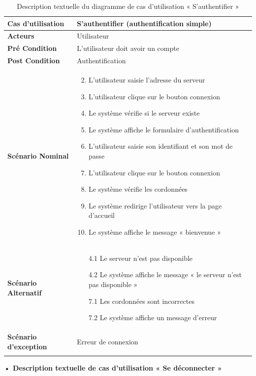 \begin{longtable}{|p{5cm}|p{10cm}|}
\hline
\textbf{Cas d'utilisation}&S'authentifier (authentification simple)\\
\hline
\textbf{Acteurs}&Utilisateur\\
\hline
\textbf{Pré Condition}&L'utilisateur doit avoir un compte\\
\hline
\textbf{Post Condition}&Authentification\\
\hline
\textbf{Scénario Nominal}&
\vspace{-\baselineskip}
\begin{enumerate}
    \setcounter{enumi}{1}
  \item L'utilisateur saisie l'adresse du serveur
  \item L'utilisateur clique sur le bouton connexion
  \item Le système vérifie si le serveur existe
  \item Le système affiche le formulaire d'authentification
  \item L'utilisateur saisie son identifiant et son mot de passe
  \item L'utilisateur clique sur le bouton connexion
  \item Le système vérifie les cordonnées
  \item Le système redirige l'utilisateur vers la page d'accueil
  \item Le système affiche le message « bienvenue »
\end{enumerate}\\
\hline
\textbf{Scénario Alternatif}&
\vspace{-\baselineskip}
\begin{enumerate}
      \item [4.1] Le serveur n'est pas disponible
      \item [4.2] Le système affiche le message « le serveur n'est pas disponible »
      \item [7.1] Les cordonnées sont incorrectes
      \item [7.2] Le système affiche un message d'erreur
\end{enumerate}\\
\hline
\textbf{Scénario d'exception}&Erreur de connexion\\
\hline
\caption{Description textuelle du diagramme de cas d'utilisation « S'authentifier »}
\label{tab:use_case_simple_authentification}
\end{longtable}

\textbf{•	Description textuelle de cas d'utilisation « Se déconnecter »}

